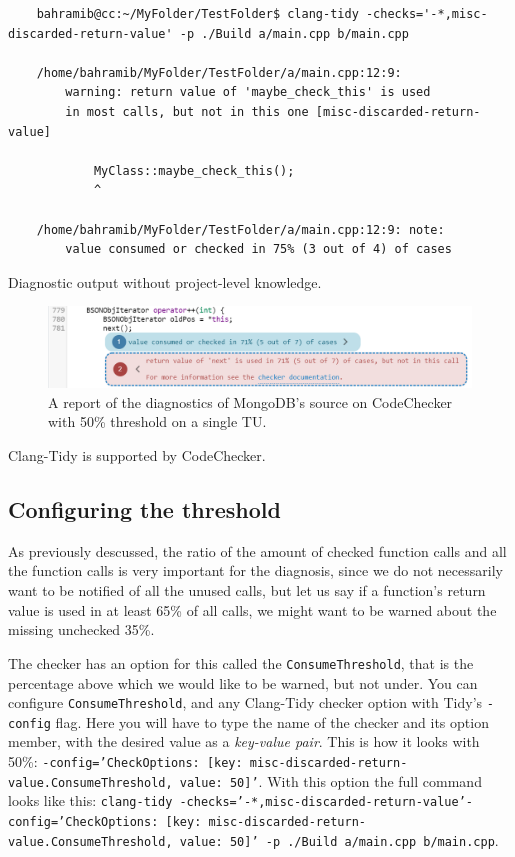 \begin{listing}[H]
	\begin{verbatim}
	bahramib@cc:~/MyFolder/TestFolder$ clang-tidy -checks='-*,misc-discarded-return-value' -p ./Build a/main.cpp b/main.cpp

	/home/bahramib/MyFolder/TestFolder/a/main.cpp:12:9:
		warning: return value of 'maybe_check_this' is used
		in most calls, but not in this one [misc-discarded-return-value]

			MyClass::maybe_check_this();
			^

	/home/bahramib/MyFolder/TestFolder/a/main.cpp:12:9: note:
		value consumed or checked in 75% (3 out of 4) of cases
	\end{verbatim}
\caption{Diagnostic output without project-level knowledge.}
\end{listing}



\begin{figure}[H]
	\includegraphics[width=\linewidth]{images/codechecker_first_ss_mongo_single_50.png}
	\caption{A report of the diagnostics of MongoDB's source on CodeChecker with 50\% threshold on a single TU.}
	\label{fig:mongo50single}
\end{figure}

Clang-Tidy is supported by CodeChecker.~\cite{codechecker}

\subsection{Configuring the threshold}

As previously descussed, the ratio of the amount of checked function calls and all the function calls is very important for the
diagnosis, since we do not necessarily want to be notified of all the unused calls, but let us say if a function's return value
is used in at least 65\% of all calls, we might want to be warned about the missing unchecked 35\%.

The checker has an option for this called the \texttt{ConsumeThreshold}, that is the percentage above which we would like to be warned,
but not under.
You can configure \texttt{ConsumeThreshold}, and any Clang-Tidy checker option with Tidy's \texttt{-config} flag. Here you will have to type
the name of the checker and its option member, with the desired value as a \emph{key-value pair}. This is how it looks with 50\%:
\texttt{-config='{CheckOptions: [{key: misc-discarded-return-value.ConsumeThreshold, value: 50}]}'}. With this option the full
command looks like this:
\texttt{clang-tidy -checks='-*,misc-discarded-return-value'-config='{CheckOptions: [{key: misc-discarded-return-value.ConsumeThreshold, value: 50}]}' -p ./Build a/main.cpp b/main.cpp}.


